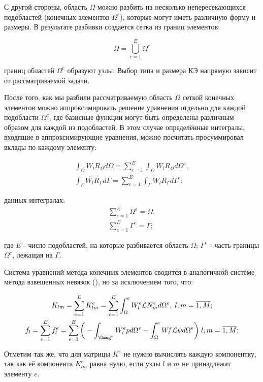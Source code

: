 \documentclass[14pt]{extreport}
\begin{document}
С другой стороны, область $\Omega$ можно разбить на несколько непересекающихся подобластей (конечных элементов $\Omega^e$), которые могут иметь различную форму и размеры. В результате разбивки создается сетка из границ элементов:

$$\Omega=\bigcup\limits_{e=1}^E\Omega^{e}$$


 границ областей $\Omega^{e}$ образуют узлы. Выбор типа и размера КЭ напрямую зависит от рассматриваемой задачи.

После того, как мы разбили рассматриваемую область $\Omega$ сеткой конечных элементов можно аппроксимировать решение уравнения отдельно для каждой подобласти $\Omega^{e}$, где базисные функции могут быть определены различным образом для каждой из подобластей. В этом случае определённые интегралы, входящие в аппроксимирующие уравнения, можно посчитать просуммировал вклады по каждому элементу:

\begin{gather}
\int_\Omega W_l R_\Omega d\Omega = \sum\limits_{e=1}^E\int_\Omega W_l R_\Omega d\Omega^e, \nonumber\\
\int_\Gamma \overline{W_l} R_\Gamma d\Gamma = \sum\limits_{e=1}^E\int_\Gamma W_l R_\Gamma d\Gamma^e;
\end{gather}


 данных интегралах:
\begin{gather}
\sum\limits_{e=1}^E\Omega^e=\Omega, \\
\sum\limits_{e=1}^E\Gamma^e=\Gamma;
\end{gather}


\noindent где $E$ - число подобластей, на которые разбивается область $\Omega$; $\Gamma^e$ - часть границы $\Omega^e$, лежащая на $\Gamma$.

Система уравнений метода конечных элементов сводится в аналогичной системе метода взвешенных невязок (), но за исключением того, что:

\begin{gather}
	K_{lm}=\sum\limits_{e=1}^{E} K_{lm}^{e}=\sum\limits_{e=1}^{E}\int_\Omega^{e} W_l^{e} \mathcal L N_{m}^{e}  d\Omega^{e}, \; l,m=\overline{1,M}; \\
f_l=\sum\limits_{e=1}^{E} f_{l}^{e}=\sum\limits_{e=1}^{E} \bigg(-\int_{\Omeg^{e}} W_{l}^{e} p d \Omega^{e} -\int_\Omega^{e} W_{l}^{e} \mathcal L \psi d \Omega^{e}\bigg) \; l,m=\overline{1,M};
\end{gather}



Отметим так же, что для матрицы $K^{e}$ не нужно вычислять каждую компонентку, так как её компонента $K_{lm}^{e}$ равна нулю, если узлы $l$ и $m$ не принадлежат элементу $e$. 
\end{document}
